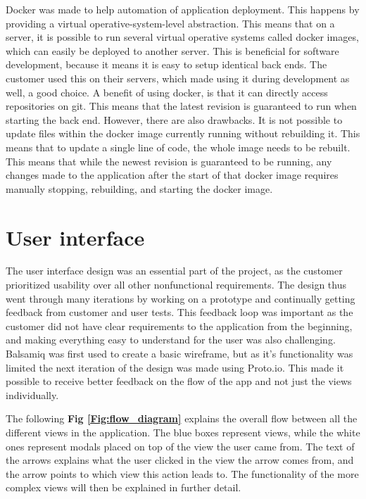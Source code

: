 Docker \cite{EHW2} was made to help automation of application deployment. This happens by providing a virtual operative-system-level abstraction. This means that on a server, it is possible to run several virtual operative systems called docker images, which can easily be deployed to another server. This is beneficial for software development, because it means it is easy to setup identical back ends. The customer used this on their servers, which made using it during development as well, a good choice. A benefit of using docker, is that it can directly access repositories on git. This means that the latest revision is guaranteed to run when starting the back end. However, there are also drawbacks. It is not possible to update files within the docker image currently running without rebuilding it. This means that to update a single line of code, the whole image needs to be rebuilt. This means that while the newest revision is guaranteed to be running, any changes made to the application after the start of that docker image requires manually stopping, rebuilding, and starting the docker image.

\section{User interface}

The user interface design was an essential part of the project, as the customer prioritized usability over all other nonfunctional requirements. The design thus went through many iterations by working on a prototype and continually getting feedback from customer and user tests. This feedback loop was important as the customer did not have clear requirements to the application from the beginning, and making everything easy to understand for the user was also challenging.  Balsamiq was first used to create a basic wireframe, but as it’s functionality was limited the next iteration of the design was made using Proto.io. This made it possible to receive better feedback on the flow of the app and not just the views individually. \newline

The following \textbf{Fig \ref{Fig:flow_diagram}} explains the overall flow between all the different views in the application. The blue boxes represent views, while the white ones represent modals placed on top of the view the user came from. The text of the arrows explains what the user clicked in the view the arrow comes from, and the arrow points to which view this action leads to.  The functionality of the more complex views will then be explained in further detail.

